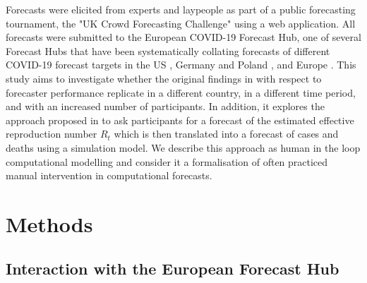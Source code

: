 \documentclass[10pt,a4paper,twocolumn]{article}
\begin{document}
Forecasts were elicited from experts and laypeople as part of a public forecasting tournament, the "UK Crowd Forecasting Challenge" using a web application. All forecasts were submitted to the European COVID-19 Forecast Hub, one of several Forecast Hubs that have been systematically collating forecasts of different COVID-19 forecast targets in the US \citep{cramerEvaluationIndividualEnsemble2021}, Germany and Poland \citep{bracherPreregisteredShorttermForecasting2021a, bracherNationalSubnationalShortterm2022}, and Europe \citep{sherrattPredictivePerformanceMultimodel2022}. This study aims to investigate whether the original findings in \citet{bosseComparingHumanModelbased2022} with respect to forecaster performance replicate in a different country, in a different time period, and with an increased number of participants. In addition, it explores the approach proposed in \citet{bosseComparingHumanModelbased2022} to ask participants for a forecast of the estimated effective reproduction number $R_t$ which is then translated into a forecast of cases and deaths using a simulation model. We describe this approach as human in the loop computational modelling and consider it a formalisation of often practiced manual intervention in computational forecasts.

\section*{Methods}

\subsection*{Interaction with the European Forecast Hub}
\end{document}
